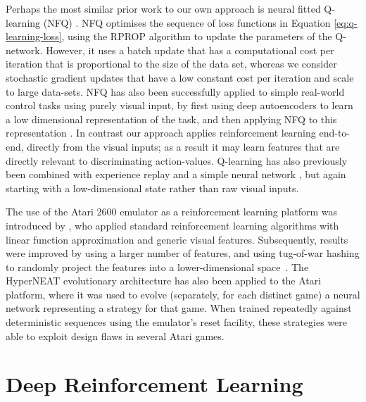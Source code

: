 \documentclass{article} \usepackage{nips13submit_e,times}
\begin{document}
Perhaps the most similar prior work to our own approach is neural fitted Q-learning (NFQ) \cite{riedmiller-nfq}. NFQ optimises the sequence of loss functions in Equation \ref{eq:q-learning-loss}, using the RPROP algorithm to update the parameters of the Q-network. However, it uses a batch update that has a computational cost per iteration that is proportional to the size of the data set, whereas we consider stochastic gradient updates that have a low constant cost per iteration and scale to large data-sets. NFQ has also been successfully applied to simple real-world control tasks using purely visual input, by first using deep autoencoders to learn a low dimensional representation of the task, and then applying NFQ to this representation \cite{lange:dfq}. In contrast our approach applies reinforcement learning end-to-end, directly from the visual inputs; as a result it may learn features that are directly relevant to discriminating action-values.  Q-learning has also previously been combined with experience replay and a simple neural network \cite{lin1993reinforcement}, but again starting with a low-dimensional state rather than raw visual inputs.

The use of the Atari 2600 emulator as a reinforcement learning platform was introduced by \cite{bellemare-ale}, who applied standard reinforcement learning algorithms with linear function approximation and generic visual features. Subsequently, results were improved by using a larger number of features, and using tug-of-war hashing to randomly project the features into a lower-dimensional space~\cite{bellemare2012sketch}. The HyperNEAT evolutionary architecture \cite{hausknecht-neuro} has also been applied to the Atari platform, where it was used to evolve (separately, for each distinct game) a neural network representing a strategy for that game. When trained repeatedly against deterministic sequences using the emulator's reset facility, these strategies were able to exploit design flaws in several Atari games. 
















 
\section{Deep Reinforcement Learning}
\label{sec:method}
\end{document}
